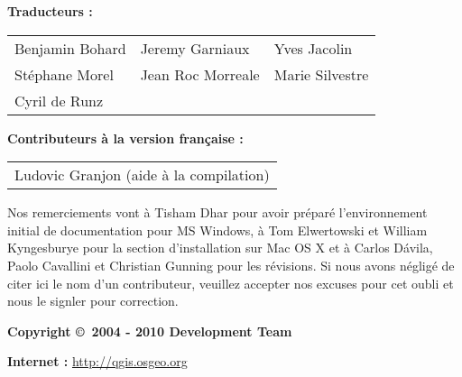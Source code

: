 \begin{flushleft}
\textbf{Traducteurs :}
  \par\bigskip\noindent
\begin{tabular}{p{4cm} p{4cm} p{4cm}}
Benjamin Bohard & Jeremy Garniaux & Yves Jacolin \\
Stéphane Morel & Jean Roc Morreale & Marie Silvestre \\
Cyril de Runz \\
\end{tabular}
\end{flushleft}

\begin{flushleft}
\textbf{Contributeurs à la version française :}
 \par\bigskip\noindent
\begin{tabular}{p{10cm} }
Ludovic Granjon (aide à la compilation) \\
\end{tabular}
\vspace{1cm}

Nos remerciements vont à Tisham Dhar pour avoir préparé l'environnement initial de documentation pour MS Windows, à Tom Elwertowski et William Kyngesburye pour la section d'installation sur Mac OS X et à Carlos  D\'{a}vila, Paolo Cavallini et Christian Gunning pour les révisions. Si nous avons négligé de citer ici le nom d'un contributeur, veuillez accepter nos excuses pour cet oubli et nous le signler pour correction.
 \par\bigskip\noindent
\textbf{Copyright \copyright~2004 - 2010 \QG Development Team}
\par\bigskip\noindent
\textbf{Internet :} \url{http://qgis.osgeo.org}
\end{flushleft}
